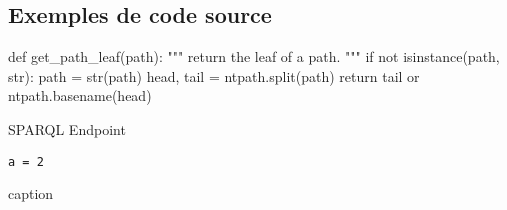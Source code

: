 \subsection{Exemples de code source}%
\label{sec:codessources}

\blindtext[1]
\begin{listing}[H]
\begin{pythoncode}
def get_path_leaf(path):
    """ return the leaf of a path. """
    if not isinstance(path, str):
        path = str(path)
    head, tail = ntpath.split(path)
    return tail or ntpath.basename(head)
\end{pythoncode}
\caption{SPARQL Endpoint}%
\label{lst:SPARQL Endpoint}
\end{listing}

\blindtext[2]


\begin{listing}[H]
\begin{verbatim}
a = 2
\end{verbatim}
\caption{caption}%
\label{lst:label}%
\end{listing}

